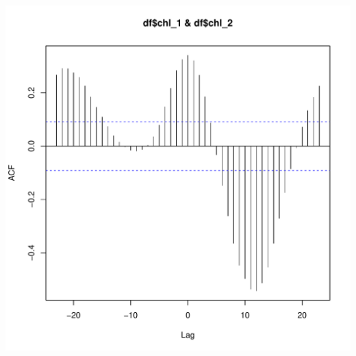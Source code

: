 \documentclass{article}\usepackage[]{graphicx}\usepackage[]{color}
\makeatletter
\def\maxwidth{ %
  \ifdim\Gin@nat@width>\linewidth
    \linewidth
  \else
    \Gin@nat@width
  \fi
}
\newenvironment{kframe}{%
 \def\at@end@of@kframe{}%
 \ifinner\ifhmode%
  \def\at@end@of@kframe{\end{minipage}}%
  \begin{minipage}{\columnwidth}%
 \fi\fi%
 \def\FrameCommand##1{\hskip\@totalleftmargin \hskip-\fboxsep
 \colorbox{shadecolor}{##1}\hskip-\fboxsep
     \hskip-\linewidth \hskip-\@totalleftmargin \hskip\columnwidth}%
 \MakeFramed {\advance\hsize-\width
   \@totalleftmargin\z@ \linewidth\hsize
   \@setminipage}}%
 {\par\unskip\endMakeFramed%
 \at@end@of@kframe}
\newenvironment{knitrout}{}{} %
\makeatother
\begin{document}
\begin{knitrout}
\begin{kframe}
\begin{alltt}
\end{alltt}
\end{kframe}
\includegraphics[width=\maxwidth]{figure/unnamed-chunk-4-2} 

\end{knitrout}
\end{document}

